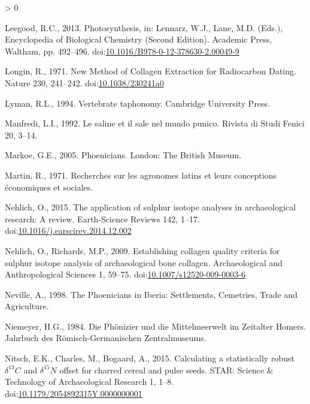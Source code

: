 \documentclass[5p]{elsarticle} %
\newlength{\cslhangindent}
\newenvironment{CSLReferences}[2] %
 {%
  \setlength{\parindent}{0pt}
  \ifodd #1 \everypar{\setlength{\hangindent}{\cslhangindent}}\ignorespaces\fi
  \ifnum #2 > 0
  \setlength{\parskip}{#2\baselineskip}
  \fi
 }%
 {}
\begin{document}
\begin{CSLReferences}{1}{0}
\leavevmode\hypertarget{ref-leegood13}{}%
Leegood, R.C., 2013. Photosynthesis, in: Lennarz, W.J., Lane, M.D. (Eds.), Encyclopedia of {Biological Chemistry} ({Second Edition}). {Academic Press}, {Waltham}, pp. 492--496. doi:\href{https://doi.org/10.1016/B978-0-12-378630-2.00049-9}{10.1016/B978-0-12-378630-2.00049-9}

\leavevmode\hypertarget{ref-longin71}{}%
Longin, R., 1971. New {Method} of {Collagen Extraction} for {Radiocarbon Dating}. Nature 230, 241--242. doi:\href{https://doi.org/10.1038/230241a0}{10.1038/230241a0}

\leavevmode\hypertarget{ref-lyman94}{}%
Lyman, R.L., 1994. Vertebrate taphonomy. {Cambridge University Press}.

\leavevmode\hypertarget{ref-manfredi92}{}%
Manfredi, L.I., 1992. Le saline et il sale nel mundo punico. Rivista di Studi Fenici 20, 3--14.

\leavevmode\hypertarget{ref-markoe05}{}%
Markoe, G.E., 2005. Phoenicians. {London}: {The British Museum}.

\leavevmode\hypertarget{ref-martin71}{}%
Martin, R., 1971. Recherches sur les agronomes latins et leurs conceptions économiques et sociales.

\leavevmode\hypertarget{ref-nehlich15}{}%
Nehlich, O., 2015. The application of sulphur isotope analyses in archaeological research: {A} review. Earth-Science Reviews 142, 1--17. doi:\href{https://doi.org/10.1016/j.earscirev.2014.12.002}{10.1016/j.earscirev.2014.12.002}

\leavevmode\hypertarget{ref-nehlich_richards09}{}%
Nehlich, O., Richards, M.P., 2009. Establishing collagen quality criteria for sulphur isotope analysis of archaeological bone collagen. Archaeological and Anthropological Sciences 1, 59--75. doi:\href{https://doi.org/10.1007/s12520-009-0003-6}{10.1007/s12520-009-0003-6}

\leavevmode\hypertarget{ref-neville98}{}%
Neville, A., 1998. The {Phoenicians} in {Iberia}: {Settlements}, {Cemetries}, {Trade} and {Agriculture}.

\leavevmode\hypertarget{ref-niemeyer84}{}%
Niemeyer, H.G., 1984. Die {Phönizier} und die {Mittelmeerwelt} im {Zeitalter Homers}. {Jahrbuch des Römisch-Germanischen Zentralmuseums}.

\leavevmode\hypertarget{ref-nitsch_etal15}{}%
Nitsch, E.K., Charles, M., Bogaard, A., 2015. Calculating a statistically robust \(\delta ^{13}C\) and \(\delta ^{15}N\) offset for charred cereal and pulse seeds. STAR: Science \& Technology of Archaeological Research 1, 1--8. doi:\href{https://doi.org/10.1179/2054892315Y.0000000001}{10.1179/2054892315Y.0000000001}


\end{CSLReferences}
\end{document}
